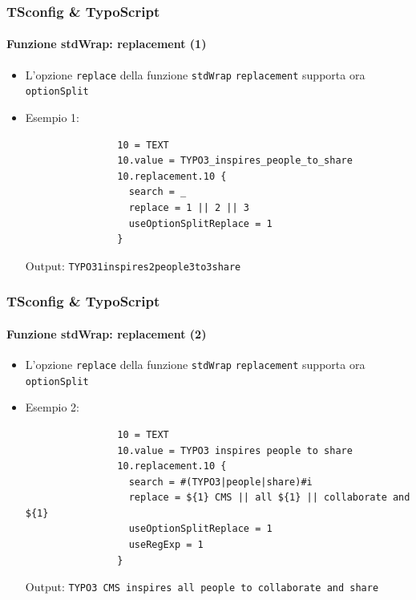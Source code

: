 \begin{frame}[fragile]
	\frametitle{TSconfig \& TypoScript}
	\framesubtitle{Funzione stdWrap: replacement (1)}

	\begin{itemize}
		\item L'opzione \texttt{replace} della funzione \texttt{stdWrap} \texttt{replacement}\newline
			supporta ora \texttt{optionSplit}

		\item Esempio 1:

			\begin{lstlisting}
				10 = TEXT
				10.value = TYPO3_inspires_people_to_share
				10.replacement.10 {
				  search = _
				  replace = 1 || 2 || 3
				  useOptionSplitReplace = 1
				}
			\end{lstlisting}

			Output:\newline
				\texttt{TYPO31inspires2people3to3share}

	\end{itemize}

\end{frame}


\begin{frame}[fragile]
	\frametitle{TSconfig \& TypoScript}
	\framesubtitle{Funzione stdWrap: replacement (2)}

	\begin{itemize}
		\item L'opzione \texttt{replace} della funzione \texttt{stdWrap} \texttt{replacement}\newline
			supporta ora \texttt{optionSplit}

		\item Esempio 2:

			\begin{lstlisting}
				10 = TEXT
				10.value = TYPO3 inspires people to share
				10.replacement.10 {
				  search = #(TYPO3|people|share)#i
				  replace = ${1} CMS || all ${1} || collaborate and ${1}
				  useOptionSplitReplace = 1
				  useRegExp = 1
				}
			\end{lstlisting}

			Output:\newline
				\texttt{TYPO3 CMS inspires all people to collaborate and share}

	\end{itemize}

\end{frame}

